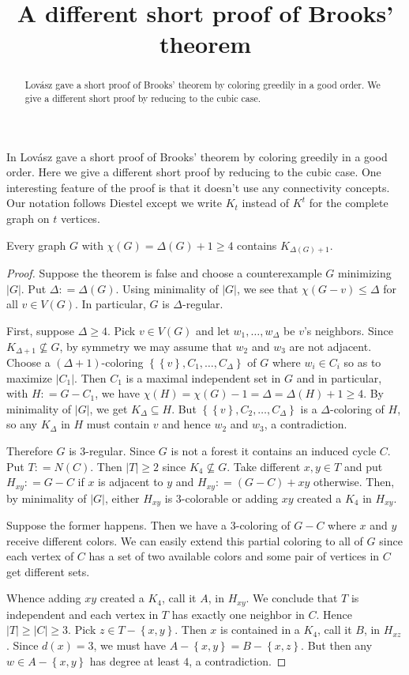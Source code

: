 \documentclass[note]{dmgt}
\title{A different short proof of Brooks' theorem}
\newcommand{\set}[1]{\left\{ #1 \right\}}
\newcommand{\card}[1]{\left|#1\right|}
\newcommand{\DefinedAs}{\mathrel{\mathop:}=}
\begin{document}
\begin{abstract}
Lov\'{a}sz gave a short proof of Brooks' theorem by coloring greedily in a good
order. We give a different short proof by reducing to the cubic case.  
\end{abstract}

In \cite{Lovasz1975269} Lov\'{a}sz gave a short proof of Brooks' theorem by
coloring greedily in a good order. Here we give a different short proof by reducing to the cubic case.  One
interesting feature of the proof is that it doesn't use any connectivity
concepts. Our notation follows Diestel \cite{Diestel} except we write $K_t$ instead of $K^t$ for the complete graph on $t$ vertices.

\begin{theorem}
Every graph $G$ with $\chi(G) = \Delta(G) + 1 \geq 4$ contains
$K_{\Delta(G) + 1}$.
\end{theorem}
\begin{proof}
Suppose the theorem is false and choose a counterexample $G$ minimizing
$\card{G}$.  Put $\Delta \DefinedAs \Delta(G)$. Using minimality of $\card{G}$,
we see that $\chi(G - v) \leq \Delta$ for all $v \in
V(G)$. In particular, $G$ is $\Delta$-regular.

First, suppose $\Delta \geq 4$.  Pick $v \in V(G)$ and let $w_1, \ldots,
w_\Delta$ be $v$'s neighbors. Since $K_{\Delta + 1} \not \subseteq G$, by
symmetry we may assume that $w_2$ and $w_3$ are not adjacent. Choose a $(\Delta
+ 1)$-coloring $\set{\set{v}, C_1, \ldots, C_\Delta}$ of $G$ where $w_i \in
C_i$ so as to maximize $\card{C_1}$.  Then $C_1$ is a maximal independent set in
$G$ and in particular, with $H \DefinedAs G - C_1$, we have $\chi(H) =
\chi(G) - 1 = \Delta = \Delta(H) + 1 \geq 4$.  By minimality of $\card{G}$, we
get $K_\Delta \subseteq H$.  But $\set{\set{v}, C_2, \ldots, C_\Delta}$ is a
$\Delta$-coloring of $H$, so any $K_\Delta$ in $H$ must contain $v$ and hence
$w_2$ and $w_3$, a contradiction.

Therefore $G$ is $3$-regular.  Since $G$ is not a forest it contains an induced
cycle $C$.  Put $T \DefinedAs N(C)$.  Then $\card{T} \geq 2$ since $K_4 \not
\subseteq G$.  Take different $x, y \in T$ and put $H_{xy} \DefinedAs G - C$ if
$x$ is adjacent to $y$ and $H_{xy} \DefinedAs (G-C) + xy$ otherwise.  Then, by
minimality of $\card{G}$, either $H_{xy}$ is $3$-colorable or adding $xy$
created a $K_4$ in $H_{xy}$.

Suppose the former happens.  Then we have a $3$-coloring of $G - C$
where $x$ and $y$ receive different colors.  We can easily extend this partial
coloring to all of $G$ since each vertex of $C$ has a set of two available
colors and some pair of vertices in $C$ get different sets. 

Whence adding $xy$ created a $K_4$, call it $A$, in $H_{xy}$.  We conclude that
$T$ is independent and each vertex in $T$ has exactly one neighbor in $C$.  Hence
$\card{T} \geq \card{C} \geq 3$. Pick $z \in T - \set{x,y}$.  Then $x$ is
contained in a $K_4$, call it $B$, in $H_{xz}$.  Since $d(x) = 3$, we must have
$A - \set{x,y} = B - \set{x, z}$.  But then any $w \in A - \set{x,y}$ has degree
at least $4$, a contradiction.
\end{proof}
\end{document}
